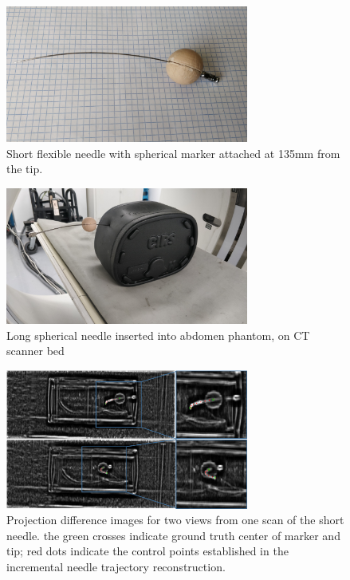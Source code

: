 \documentclass[letterpaper, 11 pt, conference]{ieeeconf}  %
\begin{document}
\begin{figure}[b]
\centering
\includegraphics[width=8cm]{short_needle.jpg}
\caption{Short flexible needle with spherical marker attached at 135mm from the tip.}
\label{short_needle_fig}
\end{figure}

\begin{figure}[t]
\centering
\includegraphics[width=8cm]{long_needle_phantom.jpg}
\caption{Long spherical needle inserted into abdomen phantom, on CT scanner bed}
\label{long_needle_fig}
\end{figure}

\begin{figure}[b]
\centering
\includegraphics[width=8cm]{projection_diff_images.png}
\caption{Projection difference images for two views from one scan of the short needle. the green crosses indicate ground truth center of marker and tip; red dots indicate the control points established in the incremental needle trajectory reconstruction.}
\label{proj_diff_fig}
\end{figure}
\end{document}
